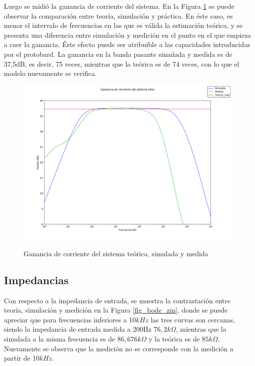Luego se midió la ganancia de corriente del sistema. En la Figura \ref{fig_bode_ais} se puede observar la comparación entre teoría, simulación y práctica. En éste caso, es menor el intervalo de frecuencias en las que es válida la estimación teórica, y se presenta una diferencia entre simulación y medición en el punto en el que empieza a caer la ganancia. Éste efecto puede ser atribuible a las capacidades introducidas por el protobard. La ganancia en la banda pasante simulada y medida es de 37,5dB, es decir, 75 veces, mientras que la teórica es de 74 veces, con lo que el modelo nuevamente se verifica. 


		\begin{figure}[H]
			\centering
			\includegraphics[scale=0.3]{./Imagenes/bode_Ais.png} \\
			\caption{Ganancia de corriente del sistema teórica, simulada y medida}
			\label{fig_bode_ais}
		\end{figure}

\subsection{Impedancias}
Con respecto a la impedancia de entrada, se muestra la contrastación entre teoría, simulación y medición en la Figura \ref{fig_bode_zin}, donde se puede apreciar que para frecuencias inferiores a 10$kHz$ las tres curvas son cercanas, siendo la impedancia de entrada medida a 200Hz $76,2k\Omega$, mientras que la simulada a la misma frecuencia es de $86,676k\Omega$ y la teórica es de $85k\Omega$. Nuevamente se observa que la medición no se corresponde con la medición a partir de 10$kHz$.

